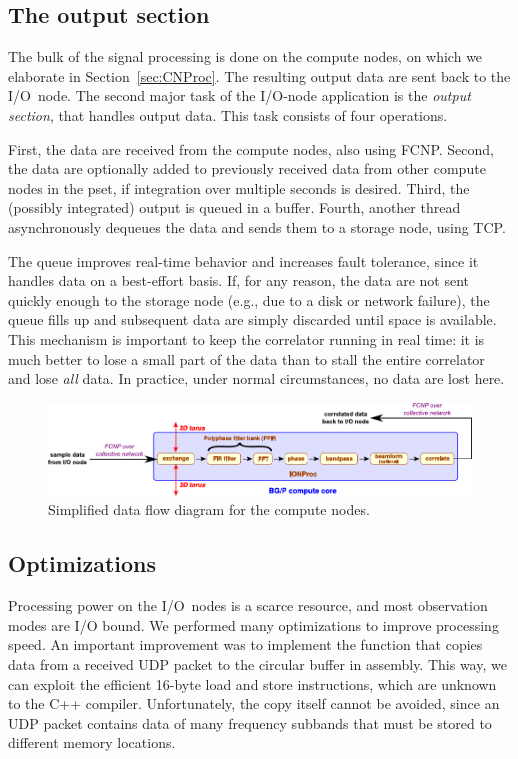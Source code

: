 \documentclass{sig-alternate}
\begin{document}
\subsection{The output section}

The bulk of the signal processing is done on the compute nodes, on which we
elaborate in Section~\ref{sec:CNProc}.
The resulting output data are sent back to the I/O~node.
The second major task of the I/O-node application is the \emph{output section},
that handles output data.
This task consists of four operations.

First, the data are received from the compute nodes, also using FCNP.
Second, the data are optionally added to previously received data from other
compute nodes in the pset, if integration over multiple seconds is desired.
Third, the (possibly integrated) output is queued in a buffer.
Fourth, another thread asynchronously dequeues the data and sends them to
a storage node, using TCP.

The queue improves real-time behavior and increases fault tolerance, since
it handles data on a best-effort basis.
If, for any reason, the data are not sent quickly enough to the storage node
(e.g., due to a disk or network failure), the queue fills up and subsequent
data are simply discarded until space is available.
This mechanism is important to keep the correlator running in real
time: it is much better to lose a small part of the data than to stall the
entire correlator and lose \emph{all\/} data.
In practice, under normal circumstances, no data are lost here.


\begin{figure}[ht]
\begin{center}
\includegraphics[width=.8\textwidth]{CN-processing.pdf}
\end{center}
\caption{Simplified data flow diagram for the compute nodes.}
\label{fig:cn-processing}
\end{figure}

\subsection{Optimizations}

Processing power on the I/O~nodes is a scarce resource, and most observation
modes are I/O bound.
We performed many optimizations to improve processing speed.
An important improvement was to implement the function that copies data from a
received UDP packet to the circular buffer in assembly.
This way, we can exploit the efficient 16-byte load and
store instructions, which are unknown to the C++ compiler.
Unfortunately, the copy itself cannot be avoided, since an UDP packet contains
data of many frequency subbands that must be stored to different memory
locations.
\end{document}
